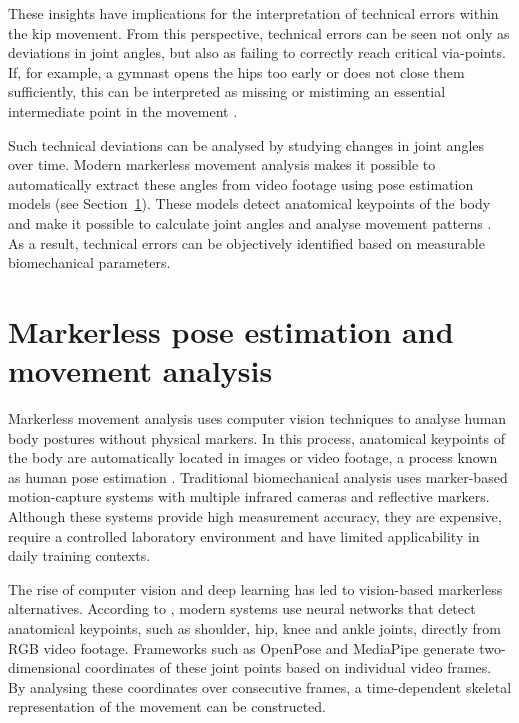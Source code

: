 These insights have implications for the interpretation of technical errors within the kip movement. From this perspective, technical errors can be seen not only as deviations in joint angles, but also as failing to correctly reach critical via-points. If, for example, a gymnast opens the hips too early or does not close them sufficiently, this can be interpreted as missing or mistiming an essential intermediate point in the movement \autocite{Yamasaki2010}.

Such technical deviations can be analysed by studying changes in joint angles over time. Modern markerless movement analysis makes it possible to automatically extract these angles from video footage using pose estimation models (see Section~\ref{sec:pose-estimatie-bewegingsanalyse}). These models detect anatomical keypoints of the body and make it possible to calculate joint angles and analyse movement patterns \autocite{Ota2025Markerless,Souaifi2025}. As a result, technical errors can be objectively identified based on measurable biomechanical parameters.

\section{Markerless pose estimation and movement analysis}
\label{sec:pose-estimatie-bewegingsanalyse}
Markerless movement analysis uses computer vision techniques to analyse human body postures without physical markers. In this process, anatomical keypoints of the body are automatically located in images or video footage, a process known as human pose estimation \autocite{cao_openpose:_2021}. Traditional biomechanical analysis uses marker-based motion-capture systems with multiple infrared cameras and reflective markers. Although these systems provide high measurement accuracy, they are expensive, require a controlled laboratory environment and have limited applicability in daily training contexts.

The rise of computer vision and deep learning has led to vision-based markerless alternatives. According to \textcite{Ota2025Markerless}, modern systems use neural networks that detect anatomical keypoints, such as shoulder, hip, knee and ankle joints, directly from RGB video footage. Frameworks such as OpenPose and MediaPipe generate two-dimensional coordinates of these joint points based on individual video frames. By analysing these coordinates over consecutive frames, a time-dependent skeletal representation of the movement can be constructed.

